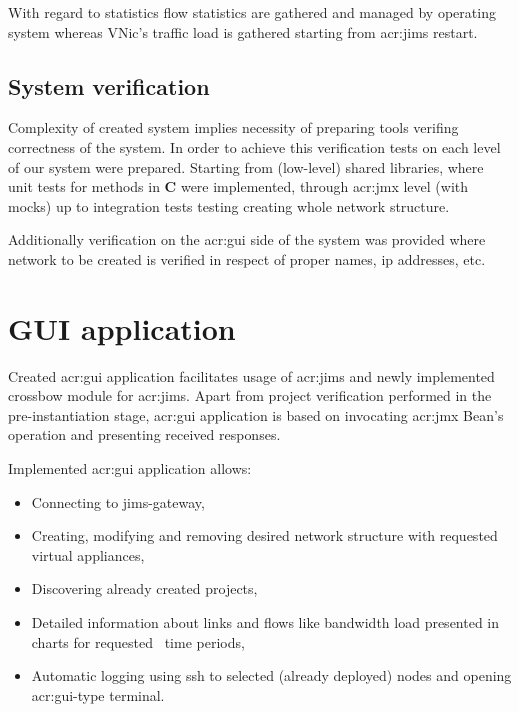 \documentclass[11pt]{book}
\begin{document}
			With regard to statistics flow statistics are gathered and managed by operating system whereas 
			VNic's traffic load is gathered starting from \gls{acr:jims} restart.
		
		\subsection{System verification}
			\label{sec:impl:verif}
		
			Complexity of created system implies necessity of preparing tools verifing correctness of the system. In order to achieve 
			this verification tests on each level of our system were prepared. Starting from (low-level) shared libraries, where unit tests
			for methods in \textbf{C} were implemented, through \gls{acr:jmx} level (with mocks) up to integration tests testing creating whole 
			network structure.
		
			Additionally verification on the \gls{acr:gui} side of the system was provided where network to be created is verified in respect of 
			proper names, ip addresses, etc.

	\section{GUI application}
		\label{sec:impl:gui}
		
		Created \gls{acr:gui} application facilitates usage of \gls{acr:jims} and newly implemented crossbow module for \gls{acr:jims}. Apart from project verification 
                performed in the pre-instantiation stage, \gls{acr:gui} application is based on invocating \gls{acr:jmx} Bean's operation and presenting received responses.

		Implemented \gls{acr:gui} application allows:
		\begin{itemize}
			\item{Connecting to jims-gateway,}
			\item{Creating, modifying and removing desired network structure with requested virtual appliances,}
			\item{Discovering already created projects,}
			\item{Detailed information about links and flows like bandwidth load presented in charts for requested \
				time periods,}
			\item{Automatic logging using ssh to selected (already deployed) nodes and opening \gls{acr:gui}-type terminal.}
		\end{itemize}		
\end{document}
